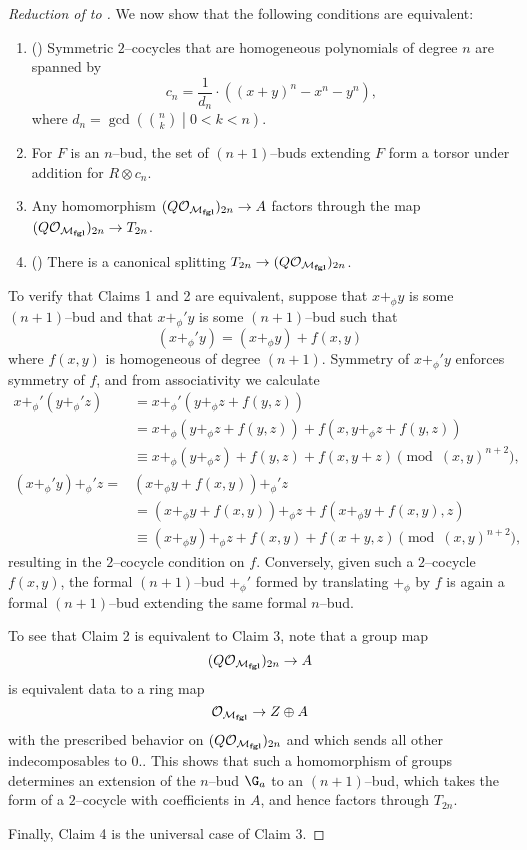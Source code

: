\begin{proof}[{Reduction of  to }]
We now show that the following conditions are equivalent:
\begin{enumerate}
\item () Symmetric $2$--cocycles that are homogeneous polynomials of degree $n$ are spanned by \[c_n = \frac{1}{d_n} \cdot ((x + y)^n - x^n - y^n),\] where $d_n = \gcd\left( \binom{n}{k} \middle| 0 < k < n \right)$.
\item For $F$ is an $n$--bud, the set of $(n+1)$--buds extending $F$ form a torsor under addition for $R \otimes c_n$.
\item Any homomorphism $(Q\mathcal O_{\mathcal{M}_{\mathbf{fgl}}})_{2n} \to A$ factors through the map $(Q \mathcal O_{\mathcal{M}_{\mathbf{fgl}}})_{2n} \to T_{2n}$.
\item () There is a canonical splitting $T_{2n} \to (Q \mathcal O_{\mathcal{M}_{\mathbf{fgl}}})_{2n}$.
\end{enumerate}

To verify that Claims 1 and 2 are equivalent, suppose that $x +_\phi y$ is some $(n+1)$--bud and that $x +_\phi' y$ is some $(n+1)$--bud such that \[(x +_\phi' y) = (x +_\phi y) + f(x, y)\] where $f(x, y)$ is homogeneous of degree $(n+1)$.  Symmetry of $x +_\phi' y$ enforces symmetry of $f$, and from associativity we calculate
\begin{align*}
x +_\phi' (y +_\phi' z) & = x +_\phi' (y +_\phi z + f(y, z)) \\
& = x +_\phi (y +_\phi z + f(y, z)) + f(x, y +_\phi z + f(y, z)) \\
& \equiv x +_\phi (y +_\phi z) + f(y, z) + f(x, y + z) \pmod{(x, y)^{n+2}}, \\
(x +_\phi' y) +_\phi' z = & (x +_\phi y + f(x, y)) +_\phi' z \\
& = (x +_\phi y + f(x, y)) +_\phi z + f(x +_\phi y + f(x, y), z) \\
& \equiv (x +_\phi y) +_\phi z + f(x, y) + f(x + y, z) \pmod{(x, y)^{n+2}},
\end{align*}
resulting in the $2$--cocycle condition on $f$.  Conversely, given such a $2$--cocycle $f(x, y)$, the formal $(n+1)$--bud $+_\phi'$ formed by translating $+_\phi$ by $f$ is again a formal $(n+1)$--bud extending the same formal $n$--bud.

To see that Claim 2 is equivalent to Claim 3, note that a group map \[(Q\mathcal O_{\mathcal{M}_{\mathbf{fgl}}})_{2n} \to A\] is equivalent data to a ring map \[\mathcal O_{\mathcal{M}_{\mathbf{fgl}}} \to Z \oplus A\] with the prescribed behavior on $(Q\mathcal O_{\mathcal{M}_{\mathbf{fgl}}})_{2n}$ and which sends all other indecomposables to $0$..  This shows that such a homomorphism of groups determines an extension of the $n$--bud $\G_a$ to an $(n+1)$--bud, which takes the form of a $2$--cocycle with coefficients in $A$, and hence factors through $T_{2n}$.

Finally, Claim 4 is the universal case of Claim 3.
\end{proof}

